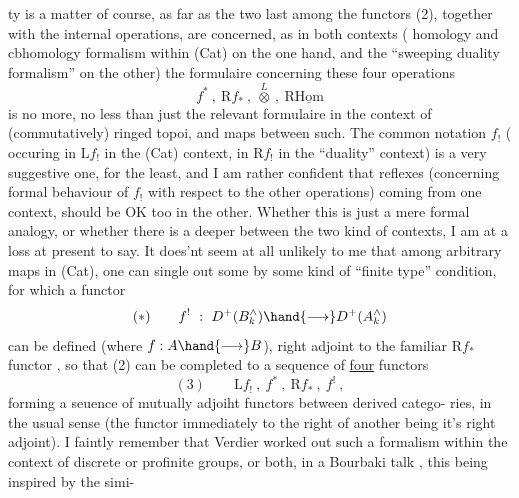 
 ty is a matter of course,  as far as the two last among the functors
(2),  together with the  internal operations,  are concerned,  as in
both contexts ( homology and cbhomology formalism within (Cat) on the
one hand,  and the ``sweeping duality formalism'' on the other) 
 the formulaire concerning these four operations
\[ f^{*} \ , \ \mathrm{R}f_{*} \ , \ \overset{L}{\otimes} \ , \ \mathrm{R}\underline{\mathrm{Hom}} \]
is no more, no less than just the relevant formulaire  in the context
of  (commutatively) ringed topoi,  and maps between such.  The common
notation  $f_{!}$  ( occuring in $\mathrm{L}f_{!}$  in the (Cat) context,  in $\mathrm{R}f_{!}$ in the
``duality'' context)  is a very suggestive one,  for the least,  and I am
rather confident that   reflexes (concerning formal behaviour of $f_{!}$
with respect to the other operations)  coming from one context,  should
be OK too in the other.  Whether this is just a mere formal analogy,
or whether there is a deeper   between the two kind of contexts,
I am at a loss at present to say.  It does'nt seem at all unlikely to
me that among arbitrary maps in (Cat),  one can single out some\hand{,} by
some kind of ``finite type'' condition,  for which a functor
\[ (*) \qquad f^{!} \ : \ D^{+}(B^{\wedge}_{k}) \hand{\longrightarrow} D^{+}(A^{\wedge}_{k}) \]
can be defined (where $f: A \hand{\longrightarrow} B$),  right adjoint to the familiar $\mathrm{R}f_{*}$
functor ,  so that (2) can be completed to a sequence of \uline{four} functors
\[ (3) \qquad \mathrm{L}f_{!} \ , \ f^{*} \ , \ \mathrm{R}f_{*} \ , \ f^{!} \ , \]
forming a seuence of mutually adjoiht functors between derived catego-%
ries,  in the usual sense (the functor immediately to the right of
another being it's right adjoint).  I faintly remember that Verdier
worked out such a formalism within the context of discrete or profinite
groups, or both,  in a Bourbaki talk , this being inspired by the simi-%
